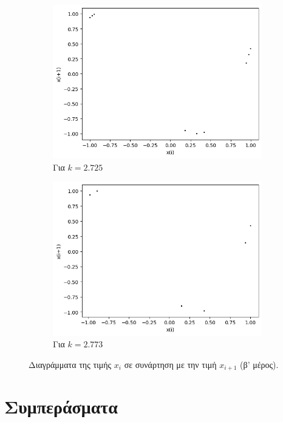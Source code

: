 \begin{figure}[ht]
\begin{subfigure}[b]{0.4\textwidth}
		\includegraphics[width=\textwidth]{LateX images/cheb q=0.9/g10}
		\caption{Για $k=2.725$}
		\label{f:k148}
	\end{subfigure}
	\hfill	
	\begin{subfigure}[b]{0.4\textwidth}
		\centering
		\includegraphics[width=\textwidth]{LateX images/cheb q=0.9/g11}
		\caption{Για $k=2.773$}
		\label{f:k149}
	\end{subfigure}
	\hfill
	
	\caption{Διαγράμματα της τιμής \(x_i\) σε συνάρτηση με την τιμή \(x_{i+1}\) (β' μέρος).}
	\label{f:k251}
\end{figure}

\clearpage

\section{Συμπεράσματα}

